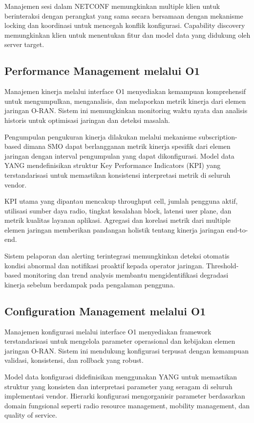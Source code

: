 Manajemen sesi dalam NETCONF memungkinkan multiple klien untuk berinteraksi dengan perangkat yang sama secara bersamaan dengan mekanisme locking dan koordinasi untuk mencegah konflik konfigurasi. Capability discovery memungkinkan klien untuk menentukan fitur dan model data yang didukung oleh server target.

\subsection{Performance Management melalui O1}

Manajemen kinerja melalui interface O1 menyediakan kemampuan komprehensif untuk mengumpulkan, menganalisis, dan melaporkan metrik kinerja dari elemen jaringan O-RAN. Sistem ini memungkinkan monitoring waktu nyata dan analisis historis untuk optimisasi jaringan dan deteksi masalah.

Pengumpulan pengukuran kinerja dilakukan melalui mekanisme subscription-based dimana SMO dapat berlangganan metrik kinerja spesifik dari elemen jaringan dengan interval pengumpulan yang dapat dikonfigurasi. Model data YANG mendefinisikan struktur Key Performance Indicators (KPI) yang terstandarisasi untuk memastikan konsistensi interpretasi metrik di seluruh vendor.

KPI utama yang dipantau mencakup throughput cell, jumlah pengguna aktif, utilisasi sumber daya radio, tingkat kesalahan block, latensi user plane, dan metrik kualitas layanan aplikasi. Agregasi dan korelasi metrik dari multiple elemen jaringan memberikan pandangan holistik tentang kinerja jaringan end-to-end.

Sistem pelaporan dan alerting terintegrasi memungkinkan deteksi otomatis kondisi abnormal dan notifikasi proaktif kepada operator jaringan. Threshold-based monitoring dan trend analysis membantu mengidentifikasi degradasi kinerja sebelum berdampak pada pengalaman pengguna.

\subsection{Configuration Management melalui O1}

Manajemen konfigurasi melalui interface O1 menyediakan framework terstandarisasi untuk mengelola parameter operasional dan kebijakan elemen jaringan O-RAN. Sistem ini mendukung konfigurasi terpusat dengan kemampuan validasi, konsistensi, dan rollback yang robust.

Model data konfigurasi didefinisikan menggunakan YANG untuk memastikan struktur yang konsisten dan interpretasi parameter yang seragam di seluruh implementasi vendor. Hierarki konfigurasi mengorganisir parameter berdasarkan domain fungsional seperti radio resource management, mobility management, dan quality of service.

